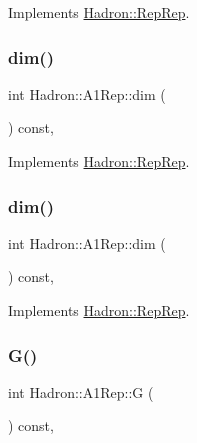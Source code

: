 Implements \mbox{\hyperlink{structHadron_1_1RepRep_a92c8802e5ed7afd7da43ccfd5b7cd92b}{Hadron\+::\+Rep\+Rep}}.

\mbox{\label{structHadron_1_1A1Rep_a4f7f61f8c9a5113c9407be6609cf7fbe}} 
\subsubsection{\texorpdfstring{dim()}{dim()}\hspace{0.1cm}{\footnotesize\ttfamily [2/3]}}
{\footnotesize\ttfamily int Hadron\+::\+A1\+Rep\+::dim (\begin{DoxyParamCaption}{ }\end{DoxyParamCaption}) const\hspace{0.3cm}{\ttfamily [inline]}, {\ttfamily [virtual]}}



Implements \mbox{\hyperlink{structHadron_1_1RepRep_a92c8802e5ed7afd7da43ccfd5b7cd92b}{Hadron\+::\+Rep\+Rep}}.

\mbox{\label{structHadron_1_1A1Rep_a4f7f61f8c9a5113c9407be6609cf7fbe}} 
\subsubsection{\texorpdfstring{dim()}{dim()}\hspace{0.1cm}{\footnotesize\ttfamily [3/3]}}
{\footnotesize\ttfamily int Hadron\+::\+A1\+Rep\+::dim (\begin{DoxyParamCaption}{ }\end{DoxyParamCaption}) const\hspace{0.3cm}{\ttfamily [inline]}, {\ttfamily [virtual]}}



Implements \mbox{\hyperlink{structHadron_1_1RepRep_a92c8802e5ed7afd7da43ccfd5b7cd92b}{Hadron\+::\+Rep\+Rep}}.

\mbox{\label{structHadron_1_1A1Rep_a0d1f85837b8f29f9e51656b8bf2abfed}} 
\subsubsection{\texorpdfstring{G()}{G()}\hspace{0.1cm}{\footnotesize\ttfamily [1/2]}}
{\footnotesize\ttfamily int Hadron\+::\+A1\+Rep\+::G (\begin{DoxyParamCaption}{ }\end{DoxyParamCaption}) const\hspace{0.3cm}{\ttfamily [inline]}, {\ttfamily [virtual]}}

